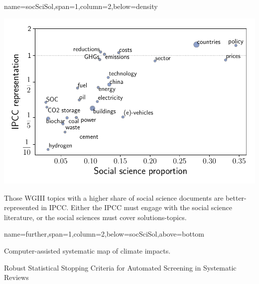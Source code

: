 \documentclass[a0paper,portrait]{baposter}
\begin{document}
\begin{poster}
{}

{name=socSciSol,span=1,column=2,below=density}{
	\begin{center}
		\includegraphics[width=0.98\linewidth]{../plots/run_1861_wg3_socsci_lp.pdf}
	\end{center}
	\vspace{-1.4em}
Those WGIII topics with a higher share of social science documents are better-represented in IPCC. Either the IPCC must engage with the social science literature, or the social sciences must cover solutions-topics.
}

{name=further,span=1,column=2,below=socSciSol,above=bottom}{

Computer-assisted systematic map of climate impacts.

Robust Statistical Stopping Criteria for Automated
Screening in Systematic Reviews





}


\end{poster}
\end{document}
